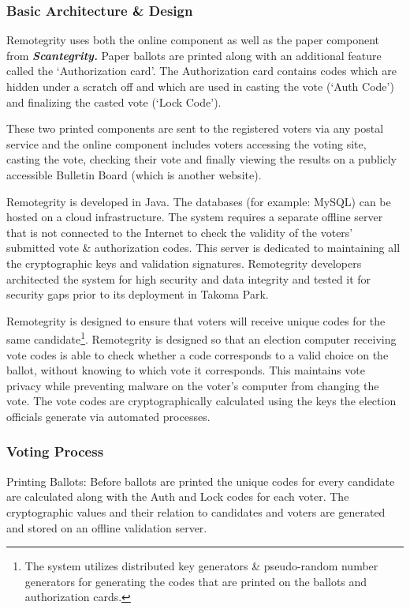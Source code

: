 \subsubsection{Basic Architecture \& Design}

Remotegrity uses both the online component as well as the paper
component from \textbf{\textit{Scantegrity. }}Paper ballots are
printed along with an additional feature called the `Authorization
card'. The Authorization card contains codes which are hidden under a
scratch off and which are used in casting the vote (`Auth Code') and
finalizing the casted vote (`Lock Code').

These two printed components are sent to the registered voters via any
postal service and the online component includes voters accessing the
voting site, casting the vote, checking their vote and finally viewing
the results on a publicly accessible Bulletin Board (which is another
website).

Remotegrity is developed in Java. The databases (for example: MySQL)
can be hosted on a cloud infrastructure. The system requires a
separate offline server that is not connected to the Internet to check
the validity of the voters' submitted vote \& authorization
codes. This server is dedicated to maintaining all the cryptographic
keys and validation signatures. Remotegrity developers architected the
system for high security and data integrity and tested it for security
gaps prior to its deployment in Takoma Park.

Remotegrity is designed to ensure that voters will receive unique
codes for the same candidate\footnote{The system utilizes distributed
  key generators \& pseudo-random number generators for generating the
  codes that are printed on the ballots and authorization
  cards.}. Remotegrity is designed so that an election computer
receiving vote codes is able to check whether a code corresponds to a
valid choice on the ballot, without knowing to which vote it
corresponds. This maintains vote privacy while preventing malware on
the voter's computer from changing the vote. The vote codes are
cryptographically calculated using the keys the election officials
generate via automated processes.

\subsubsection{Voting Process}

Printing Ballots: Before ballots are printed the unique codes for
every candidate are calculated along with the Auth and Lock codes for
each voter. The cryptographic values and their relation to candidates
and voters are generated and stored on an offline validation server.

